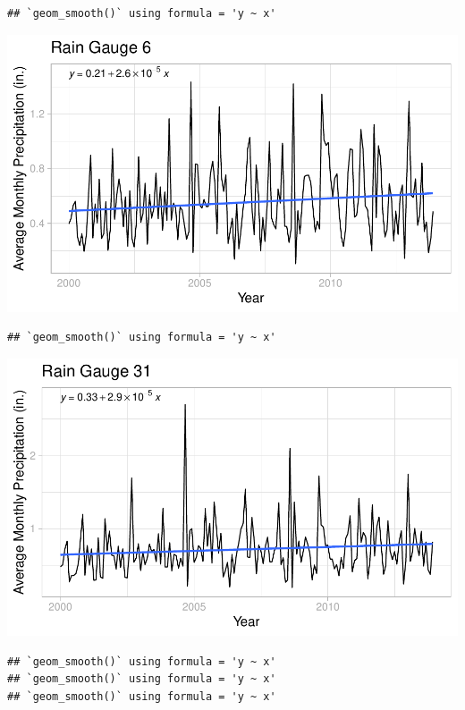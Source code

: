 \documentclass[
  12pt,
]{article}
\begin{document}
\begin{verbatim}
## `geom_smooth()` using formula = 'y ~ x'
\end{verbatim}

\includegraphics{Project_Template_files/figure-latex/Average Monthly Precipitation Plots-2.pdf}

\begin{verbatim}
## `geom_smooth()` using formula = 'y ~ x'
\end{verbatim}

\includegraphics{Project_Template_files/figure-latex/Average Monthly Precipitation Plots-3.pdf}

\begin{verbatim}
## `geom_smooth()` using formula = 'y ~ x'
## `geom_smooth()` using formula = 'y ~ x'
## `geom_smooth()` using formula = 'y ~ x'
\end{verbatim}
\end{document}

